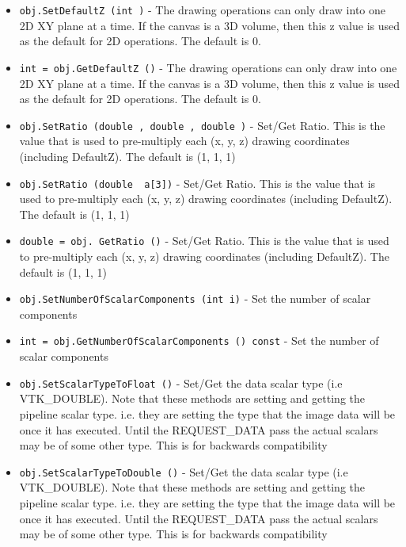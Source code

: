 \begin{itemize}
\item  \verb|obj.SetDefaultZ (int )| -  The drawing operations can only draw into one 2D XY plane at a time.
 If the canvas is a 3D volume, then this z value is used
 as the default for 2D operations. The default is 0.

\item  \verb|int = obj.GetDefaultZ ()| -  The drawing operations can only draw into one 2D XY plane at a time.
 If the canvas is a 3D volume, then this z value is used
 as the default for 2D operations. The default is 0.

\item  \verb|obj.SetRatio (double , double , double )| -  Set/Get Ratio. This is the value that is used to pre-multiply each
 (x, y, z) drawing coordinates (including DefaultZ). The default
 is (1, 1, 1)

\item  \verb|obj.SetRatio (double  a[3])| -  Set/Get Ratio. This is the value that is used to pre-multiply each
 (x, y, z) drawing coordinates (including DefaultZ). The default
 is (1, 1, 1)

\item  \verb|double = obj. GetRatio ()| -  Set/Get Ratio. This is the value that is used to pre-multiply each
 (x, y, z) drawing coordinates (including DefaultZ). The default
 is (1, 1, 1)

\item  \verb|obj.SetNumberOfScalarComponents (int i)| -  Set the number of scalar components

\item  \verb|int = obj.GetNumberOfScalarComponents () const| -  Set the number of scalar components

\item  \verb|obj.SetScalarTypeToFloat ()| -  Set/Get the data scalar type (i.e VTK\_DOUBLE). Note that these methods
 are setting and getting the pipeline scalar type. i.e. they are setting
 the type that the image data will be once it has executed. Until the
 REQUEST\_DATA pass the actual scalars may be of some other type. This is
 for backwards compatibility

\item  \verb|obj.SetScalarTypeToDouble ()| -  Set/Get the data scalar type (i.e VTK\_DOUBLE). Note that these methods
 are setting and getting the pipeline scalar type. i.e. they are setting
 the type that the image data will be once it has executed. Until the
 REQUEST\_DATA pass the actual scalars may be of some other type. This is
 for backwards compatibility


\end{itemize}
